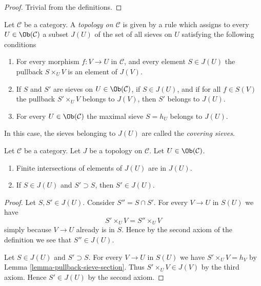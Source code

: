 \begin{proof}
Trivial from the definitions.
\end{proof}

\begin{definition}
\label{definition-topology}
Let $\mathcal{C}$ be a category. A {\it topology on $\mathcal{C}$} is given
by a rule which assigns to every $U \in \Ob(\mathcal{C})$
a subset $J(U)$ of the set of all sieves on $U$ satisfying
the following conditions
\begin{enumerate}
\item For every morphism $f : V \to U$ in $\mathcal{C}$, and
every element $S \in J(U)$ the pullback $S \times_U V$
is an element of $J(V)$.
\item If $S$ and $S'$ are sieves on $U \in \Ob(\mathcal{C})$,
if $S \in J(U)$, and if for all $f \in S(V)$ the pullback
$S' \times_U V$ belongs to $J(V)$, then $S'$ belongs to $J(U)$.
\item For every $U \in \Ob(\mathcal{C})$ the
maximal sieve $S = h_U$ belongs to $J(U)$.
\end{enumerate}
\end{definition}

\noindent
In this case, the sieves belonging to $J(U)$ are called
the {\it covering sieves}.

\begin{lemma}
\label{lemma-topology-basic}
Let $\mathcal{C}$ be a category.
Let $J$ be a topology on $\mathcal{C}$.
Let $U \in \Ob(\mathcal{C})$.
\begin{enumerate}
\item Finite intersections of elements of $J(U)$ are in $J(U)$.
\item If $S \in J(U)$ and $S' \supset S$, then $S' \in J(U)$.
\end{enumerate}
\end{lemma}

\begin{proof}
Let $S, S' \in J(U)$. Consider $S'' = S \cap S'$. For every
$V \to U$ in $S(U)$ we have
$$
S' \times_U V = S'' \times_U V
$$
simply because $V \to U$ already is in $S$. Hence by the second
axiom of the definition we see that $S'' \in J(U)$.

\medskip\noindent
Let $S \in J(U)$ and $S' \supset S$. For every
$V \to U$ in $S(U)$ we have $S' \times_U V = h_V$ by
Lemma \ref{lemma-pullback-sieve-section}. Thus
$S' \times_U V \in J(V)$ by the third axiom. Hence
$S' \in J(U)$ by the second axiom.
\end{proof}

